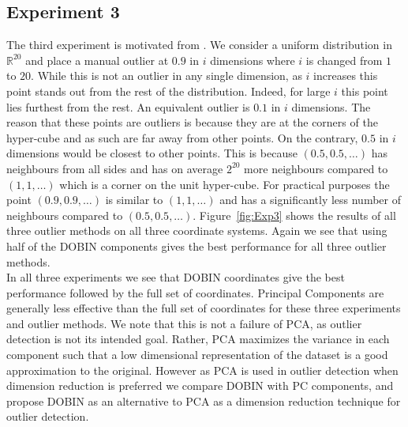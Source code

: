 \documentclass[11pt]{article}
\begin{document}
\subsection{Experiment 3}
The third experiment is motivated from \cite{zimek2012survey}. We consider a uniform distribution in $\mathbb{R}^{20}$ and place a manual outlier at $0.9$ in $i$ dimensions where $i$ is changed from $1$ to $20$. While this is not an outlier in any single dimension, as $i$ increases this point stands out from the rest of the distribution. Indeed, for large $i$ this  point lies furthest from the rest. An equivalent outlier is $0.1$ in $i$ dimensions. The reason that these points are outliers is because they are at the corners of the hyper-cube and as such are far away from other points. On the contrary, $0.5$ in $i$ dimensions would be closest to other points. This is because $(0.5, 0.5, \ldots)$ has neighbours from all sides and has on average $2^{20}$ more neighbours compared to $(1, 1, \ldots)$  which is a corner on the unit hyper-cube. For practical purposes the point $(0.9, 0.9, \ldots)$ is similar to $(1, 1, \ldots)$ and has a significantly less number of neighbours compared to $(0.5, 0.5, \ldots)$. Figure~\ref{fig:Exp3} shows the results of all three outlier methods on all three coordinate systems. Again we see that using half of the DOBIN components gives the best performance for all three outlier methods.    \\

In all three experiments we see that DOBIN coordinates give the best performance followed by the full set of coordinates. Principal Components are generally less effective than the full set of coordinates for these three experiments and outlier methods. We note that this is not a failure of PCA, as outlier detection is not its intended goal. Rather, PCA maximizes the variance in each component such that a low dimensional representation of the dataset is a good approximation to the original. However as PCA is used in outlier detection when dimension reduction is preferred we compare DOBIN with PC components, and propose DOBIN as an alternative to PCA as a dimension reduction technique for outlier detection. %
\end{document}
